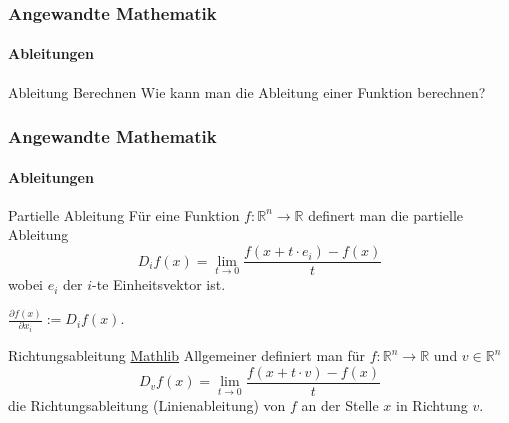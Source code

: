 \documentclass{beamer}
\begin{document}
    \begin{frame}
        \frametitle{Angewandte Mathematik}
        \framesubtitle{Ableitungen}
        \begin{block}{Ableitung Berechnen}
            Wie kann man die Ableitung einer Funktion berechnen?
        \end{block}
    
    \end{frame}




    \begin{frame}
        \frametitle{Angewandte Mathematik}
        \framesubtitle{Ableitungen}  
        \begin{block}{Partielle Ableitung}
            Für eine Funktion $f: \mathbb{R}^n \to \mathbb{R}$ definert man die partielle Ableitung 
            \[
                D_i f (x) = \lim_{t \to 0} \frac{f(x + t \cdot e_i) - f(x)}{t}
                \]
            wobei \( e_i \) der \( i \)-te Einheitsvektor ist. 
           
            \( \frac{\partial f(x)}{\partial x_i} :=  D_i f (x)\).
            
        \end{block}

        \begin{block}{Richtungsableitung \href{https://github.com/leanprover-community/mathlib4/blob/f4f0b47a2f859d27e965c812344deb1435fe8d48/Mathlib/Analysis/Calculus/LineDeriv/Basic.lean\#L69-L70}{Mathlib}}
            Allgemeiner definiert man für $f: \mathbb{R}^n \to \mathbb{R}$ und  $v \in \mathbb{R}^n$
            \[
                D_v f (x) = \lim_{t \to 0} \frac{f(x + t \cdot v) - f(x)}{t}
                \]
            die Richtungsableitung (Linienableitung) von $f$ an der Stelle $x$ in Richtung $v$.            
        \end{block}
    \end{frame}
\end{document}
